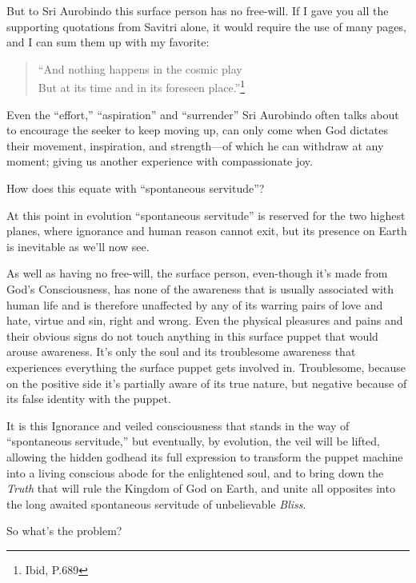 \documentclass[12pt,a4paper]{book}
\begin{document}
But to Sri Aurobindo this surface person has no free-will. If I gave
you all the supporting quotations from Savitri alone, it would require
the use of many pages, and I can sum them up with my favorite:

\newpage
\begin{verse}
``And nothing happens in the cosmic play\\
But at its time and in its foreseen place.''\footnote{Ibid, P.689}
\end{verse}


Even the ``effort,'' ``aspiration'' and ``surrender'' Sri Aurobindo
often talks about to encourage the seeker to keep moving up, can only
come when God dictates their movement, inspiration, and strength---of
which he can withdraw at any moment; giving us another experience with
compassionate joy.

How does this equate with ``spontaneous servitude''?

At this point in evolution ``spontaneous servitude'' is reserved for
the two highest planes, where ignorance and human reason cannot exit,
but its presence on Earth is inevitable as we'll now see.

As well as having no free-will, the surface person, even-though it's
made from God's Consciousness, has none of the awareness that is
usually associated with human life and is therefore unaffected by any
of its warring pairs of love and hate, virtue and sin, right and
wrong. Even the physical pleasures and pains and their obvious signs
do not touch anything in this surface puppet that would arouse
awareness. It's only the soul and its troublesome awareness that
experiences everything the surface puppet gets involved
in. Troublesome, because on the positive side it's partially aware of
its true nature, but negative because of its false identity with the
puppet.

It is this Ignorance and veiled consciousness that stands in the way
of ``spontaneous servitude,'' but eventually, by evolution, the veil
will be lifted, allowing the hidden godhead its full expression to
transform the puppet machine into a living conscious abode for the
enlightened soul, and to bring down the \emph{Truth} that will rule
the Kingdom of God on Earth, and unite all opposites into the long
awaited spontaneous servitude of unbelievable \emph{Bliss}.

\noindent So what's the problem?
\end{document}
